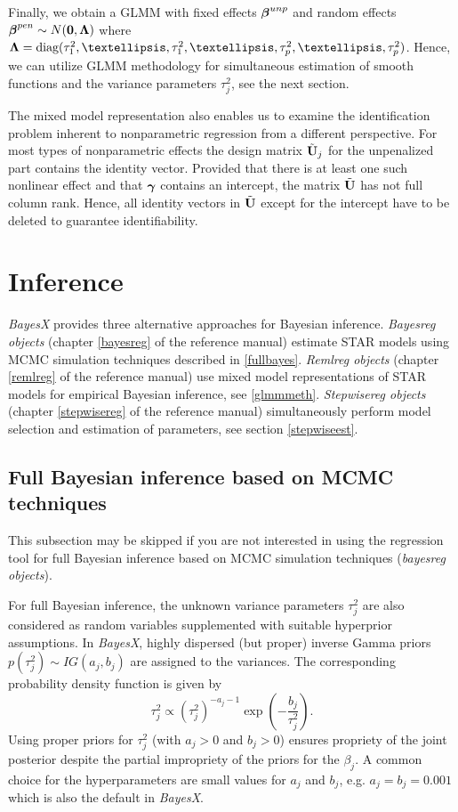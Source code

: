 \documentclass[11pt,a4paper,twoside]{bayesxarticle}
\begin{document}
Finally, we obtain a GLMM with fixed effects $\boldsymbol{\beta}^{unp}$ and
random effects $\boldsymbol{\beta}^{pen} \sim N(\boldsymbol{0},\boldsymbol{\Lambda})$ where $\Lambdavec =
\diag(\tau^2_1,\dots,\tau^2_1,\dots,\tau^2_p,\dots,\tau^2_p)$.
Hence, we can utilize GLMM methodology for simultaneous estimation
of smooth functions and the variance parameters $\tau^2_j$, see the
next section.

The mixed model representation also enables us to examine the
identification problem inherent to nonparametric regression from a
different perspective. For most types of nonparametric effects the
design matrix $\tilde{\mathbf{U}}_j$ for the unpenalized part contains the
identity vector. Provided that there is at least one such nonlinear
effect and that $\boldsymbol{\gamma}$ contains an intercept, the matrix
$\tilde{\mathbf{U}}$ has not full column rank. Hence, all identity vectors in
$\tilde{\mathbf{U}}$ except for the intercept have to be deleted to guarantee
identifiability.


\section{Inference}
\label{inference}

{\em BayesX} provides three alternative approaches for Bayesian
inference. {\em Bayesreg objects} (chapter \ref*{bayesreg} of the
reference manual) estimate STAR models using MCMC simulation
techniques described in \autoref{fullbayes}. {\em Remlreg objects}
(chapter \ref*{remlreg} of the reference manual) use mixed model
representations of STAR models for empirical Bayesian inference, see
\autoref{glmmmeth}. {\em Stepwisereg objects} (chapter \ref*{stepwisereg}
of the reference manual)
simultaneously perform model selection and
estimation of parameters, see section \autoref{stepwiseest}.



\subsection{Full Bayesian inference based on MCMC techniques}
\label{fullbayes}

This subsection may be skipped if you are not interested in using
the regression tool for full Bayesian inference based on MCMC
simulation techniques ({\em bayesreg objects}).

For full Bayesian inference, the unknown variance parameters
$\tau_j^2$ are also considered as random variables supplemented with
suitable hyperprior assumptions. In {\em BayesX}, highly dispersed
(but proper) inverse Gamma priors $p(\tau^2_j) \sim IG(a_j,b_j)$ are
assigned to the variances. The corresponding probability density
function is given by
$$
 \tau_j^2 \propto (\tau^2_j)^{-a_j-1}\exp\left(-\frac{b_j}{\tau^2_j}\right).
$$
Using proper priors for $\tau_j^2$ (with $a_j>0$ and $b_j>0$)
ensures propriety of the joint posterior despite the partial
impropriety of the priors for the $\beta_j$. A common choice for the
hyperparameters are small values for $a_j$ and $b_j$, e.g.
$a_j=b_j=0.001$ which is also the default in {\em BayesX}.
\end{document}
